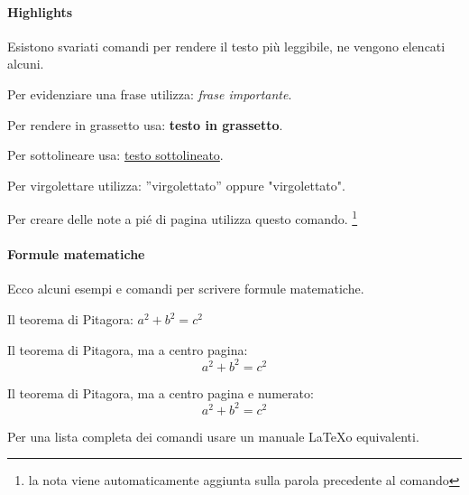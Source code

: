 \documentclass{article}
\begin{document}
\paragraph{Highlights} Esistono svariati comandi per rendere il testo più leggibile, ne vengono elencati alcuni.

Per evidenziare una frase utilizza: \emph{frase importante}.

Per rendere in grassetto usa: \textbf{testo in grassetto}.

Per sottolineare usa: \underline{testo sottolineato}.

Per virgolettare utilizza: ''virgolettato'' oppure "virgolettato".

Per creare delle note a pié di pagina utilizza questo comando. \footnote{la nota viene automaticamente aggiunta sulla parola precedente al comando}

\paragraph{Formule matematiche} Ecco alcuni esempi e comandi per scrivere formule matematiche.

Il teorema di Pitagora: $a^2 + b^2 = c^2$

Il teorema di Pitagora, ma a centro pagina: \[a^2 + b^2 = c^2\]

Il teorema di Pitagora, ma a centro pagina e numerato: 
\begin{equation}
    a^2 + b^2 = c^2
\end{equation}

Per una lista completa dei comandi usare un manuale \LaTeX o equivalenti.
\end{document}
